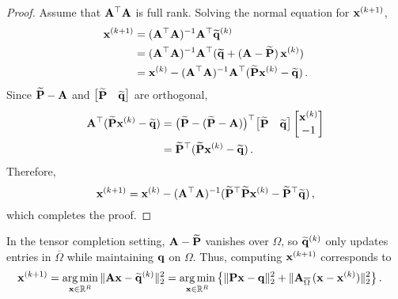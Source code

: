 \begin{proof}
Assume that $\mathbf{A}^\top \mathbf{A}$ is full rank.
Solving the normal equation for $\mathbf{x}^{(k+1)}$,
\begin{align*}
\mathbf{x}^{(k+1)}
&= (\mathbf{A}^\top \mathbf{A})^{-1} \mathbf{A}^\top \widetilde{\mathbf{q}}^{(k)}\\
&= (\mathbf{A}^\top \mathbf{A})^{-1} \mathbf{A}^\top (\widetilde{\mathbf{q}} + (\mathbf{A} - \widetilde{\mathbf{P}})\, \mathbf{x}^{(k)})
\\ & =
\mathbf{x}^{(k)} - (\mathbf{A}^\top \mathbf{A})^{-1} \mathbf{A}^\top (\widetilde{\mathbf{P}} \mathbf{x}^{(k)} - \widetilde{\mathbf{q}})\,.
\end{align*}
Since $\widetilde{\mathbf{P}}-\mathbf{A}$ and $\bigl[\begin{matrix}
\widetilde{\mathbf{P}} & \widetilde{\mathbf{q}}
\end{matrix}\bigr]$ are orthogonal, 
\begin{align*}
    \mathbf{A}^\top (\widetilde{\mathbf{P}} \mathbf{x}^{(k)} - \widetilde{\mathbf{q}})
    &=
    \bigl(\widetilde{\mathbf{P}} - (\widetilde{\mathbf{P}} - \mathbf{A})\bigr)^\top \bigl[\begin{matrix}
        \widetilde{\mathbf{P}} & \widetilde{\mathbf{q}}
    \end{matrix}\bigr] \begin{bmatrix}
    \mathbf{x}^{(k)} \\ -1
    \end{bmatrix} \\
    &= 
    \widetilde{\mathbf{P}}^\top (\widetilde{\mathbf{P}} \mathbf{x}^{(k)} - \widetilde{\mathbf{q}})\,.
\end{align*}
Therefore,
\[
    \mathbf{x}^{(k+1)}
    =
    \mathbf{x}^{(k)} - (\mathbf{A}^\top \mathbf{A})^{-1} (\widetilde{\mathbf{P}}^\top \widetilde{\mathbf{P}} \mathbf{x}^{(k)} - \widetilde{\mathbf{P}}^\top \widetilde{\mathbf{q}})\,,
\]
which completes the proof.
\end{proof}

\begin{remark}
In the tensor completion setting, $\mathbf{A}-\widetilde{\mathbf{P}}$ vanishes over $\Omega$,
so $\widetilde{\mathbf{q}}^{(k)}$ only updates entries in $\overline{\Omega}$ while maintaining $\mathbf{q}$ on $\Omega$.
Thus, computing $\mathbf{x}^{(k+1)}$ corresponds to
\begin{align*}
    \mathbf{x}^{(k+1)}
    &=
    \operatorname*{arg\,min}_{\mathbf{x} \in \mathbb{R}^R}\, \lVert\mathbf{Ax}-\widetilde{\mathbf{q}}^{(k)}\rVert^2_2
    = 
    \operatorname*{arg\,min}_{\mathbf{x} \in \mathbb{R}^R}\, \bigl\{\lVert\mathbf{Px}-\mathbf{q}\rVert^2_2 + \lVert\mathbf{A}_{\overline \Omega}\,(\mathbf{x} - \mathbf{x}^{(k)})\rVert_2^2\bigr\}\,.
\end{align*}
\end{remark}

